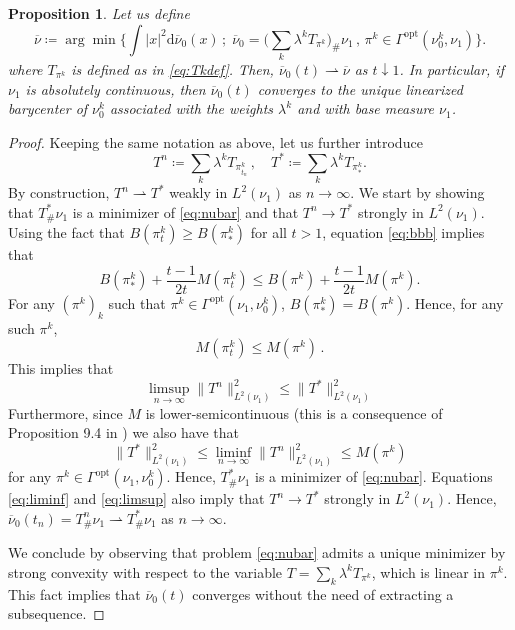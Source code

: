 \documentclass[12pt]{amsart}
\numberwithin{equation}{section}
\let\mr=\mathrm
\def\ed{\mathrm{d}}
\theoremstyle{plain}
\newtheorem{proposition}[theorem]{Proposition}
\theoremstyle{definition}
\begin{document}
\begin{proposition} 
Let us define
\begin{equation}\label{eq:nubar}
\overline{\nu} \coloneqq  \arg\min \Big\{ \int |x|^2 \ed \overline{\nu}_0(x) \, ;\;  \overline{\nu}_0 = \Big(\sum_k \lambda^k T_{\pi^k}\Big)_\# \nu_1\,, \,
\pi^k \in \Gamma^{\mr{opt}}(\nu^k_0,\nu_1) \Big\}.
\end{equation}
where $T_{\pi^k}$ is defined as in \eqref{eq:Tkdef}. Then, $\overline{\nu}_0(t) \rightharpoonup \overline{\nu}$ as $t\downarrow 1$. In particular, if 
$\nu_1$ is absolutely continuous, then $\overline{\nu}_0(t)$ converges  to the unique linearized barycenter of $\nu_0^k$ associated with the weights $\lambda^k$ and with base measure $\nu_1$.
\end{proposition}

\begin{proof} 
Keeping the same notation as above, let us further introduce
\[
T^n \coloneqq \sum_k \lambda^k T_{\pi^k_{t_n}} \,, \quad T^* \coloneqq \sum_k \lambda^k T_{\pi^k_*}. 
\]
By construction,  $T^n \rightharpoonup T^*$ weakly in $L^2(\nu_1)$ as $n \rightarrow \infty$. We start by showing that $T^*_\# \nu_1$ is a minimizer of \eqref{eq:nubar} and that $T^n \rightarrow T^*$ strongly in $L^2(\nu_1)$.
Using the fact that $B(\pi^k_t) \geq B(\pi^k_*)$ for all $t>1$, equation \eqref{eq:bbb} implies that
\[
B(\pi^k_*) + \frac{t-1}{2t} M(\pi^k_t)  \leq B(\pi^k) +  \frac{t-1}{2t} M(\pi^k).
\]
For any $(\pi^k)_k$ such that $\pi^k \in \Gamma^{\mr{opt}}(\nu_1,\nu_0^k)$, $B(\pi^k_*) = B(\pi^k)$. Hence, for any such $\pi^k$,
\[
M(\pi^k_t) \leq  M(\pi^k)\,.
\]
This implies that
\begin{equation}\label{eq:liminf}
\limsup_{n \rightarrow \infty} \| T^n\|_{L^2(\nu_1)}^2 \leq  \| T^*\|_{L^2(\nu_1)}^2
\end{equation}
Furthermore, since $M$ is lower-semicontinuous (this is a consequence of Proposition 9.4 in \cite{gozlan2017kantorovich}) we also have that
\begin{equation}\label{eq:limsup}
 \| T^*\|_{L^2(\nu_1)}^2 \leq \liminf_{n \rightarrow \infty}   \| T^n\|_{L^2(\nu_1)}^2  \leq  M(\pi^k)
\end{equation}
for any $\pi^k \in \Gamma^{\mr{opt}}(\nu_1,\nu_0^k)$.  Hence, $T^*_\# \nu_1$ is a minimizer of \eqref{eq:nubar}. Equations \eqref{eq:liminf} and \eqref{eq:limsup} also imply that $T^n \rightarrow T^*$ strongly in $L^2(\nu_1)$. Hence, $\overline{\nu}_0(t_n) = T^n_\# \nu_1 \rightharpoonup T^*_\# \nu_1$ as $n \rightarrow \infty$.

We conclude by observing that problem \eqref{eq:nubar} admits a unique minimizer by strong convexity with respect to the variable $T = \sum_k\lambda^k T_{\pi^k}$, which is linear in $\pi^k$. This fact implies that $\overline{\nu}_0(t)$ converges without the need of extracting a subsequence.
\end{proof}
\end{document}
